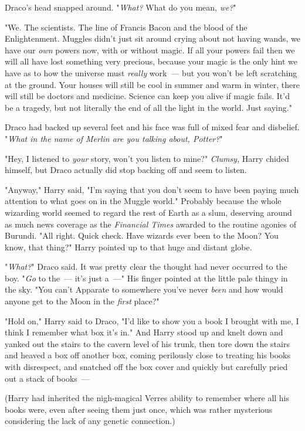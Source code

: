 Draco's head snapped around. "\emph{What?} What do you mean, \emph{we?}"

"We. The scientists. The line of Francis Bacon and the blood of the
Enlightenment. Muggles didn't just sit around crying about not having wands, we
have our \emph{own} powers now, with or without magic. If all your powers fail
then we will all have lost something very precious, because your magic is the
only hint we have as to how the universe must \emph{really} work~--- but you
won't be left scratching at the ground. Your houses will still be cool in
summer and warm in winter, there will still be doctors and medicine. Science
can keep you alive if magic fails. It'd be a tragedy, but not literally the end
of all the light in the world. Just saying."

Draco had backed up several feet and his face was full of mixed fear and
disbelief. "\emph{What in the name of Merlin are you talking about, Potter?}"

"Hey, I listened to \emph{your} story, won't you listen to mine?"
\emph{Clumsy,} Harry chided himself, but Draco actually did stop backing off
and seem to listen.

"Anyway," Harry said, "I'm saying that you don't seem to have been paying much
attention to what goes on in the Muggle world." Probably because the whole
wizarding world seemed to regard the rest of Earth as a slum, deserving around
as much news coverage as the \emph{Financial Times} awarded to the routine
agonies of Burundi. "All right. Quick check. Have wizards ever been to the
Moon? You know, that thing?" Harry pointed up to that huge and distant globe.

"\emph{What?}" Draco said. It was pretty clear the thought had never occurred to
the boy. "\emph{Go} to the~--- it's just a~---" His finger pointed at the little
pale thingy in the sky. "You can't Apparate to somewhere you've never
\emph{been} and how would anyone get to the Moon in the \emph{first} place?"

"Hold on," Harry said to Draco, "I'd like to show you a book I brought with me,
I think I remember what box it's in." And Harry stood up and knelt down and
yanked out the stairs to the cavern level of his trunk, then tore down the
stairs and heaved a box off another box, coming perilously close to treating
his books with disrespect, and snatched off the box cover and quickly but
carefully pried out a stack of books~---

(Harry had inherited the nigh-magical Verres ability to remember where all his
books were, even after seeing them just once, which was rather mysterious
considering the lack of any genetic connection.)

